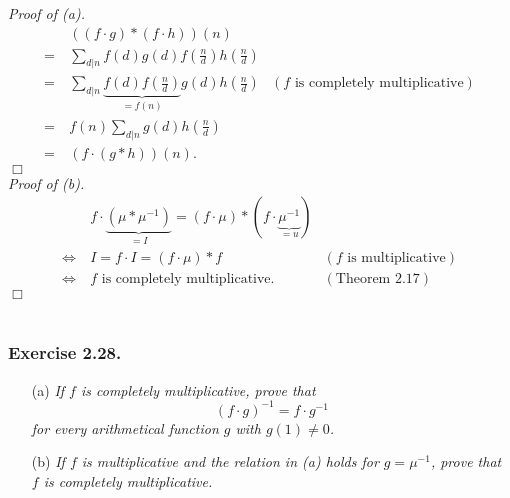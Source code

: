 \documentclass{article}
\begin{document}
\emph{Proof of (a).}
  \begin{align*}
    & \: ((f \cdot g) * (f \cdot h))(n) \\
    =& \: \sum_{d|n} f(d)g(d) f\left(\frac{n}{d}\right)h\left(\frac{n}{d}\right) \\
    =& \: \sum_{d|n} \underbrace{f(d)f\left(\frac{n}{d}\right)}_{= f(n)}
        g(d) h\left(\frac{n}{d}\right)
      & (\text{$f$ is completely multiplicative}) \\
    =& \: f(n) \sum_{d|n} g(d) h\left(\frac{n}{d}\right) \\
    =& \: (f \cdot (g * h))(n).
  \end{align*}
$\Box$ \\



\emph{Proof of (b).}
  \begin{align*}
    & \: f \cdot \underbrace{(\mu * \mu^{-1})}_{= I}
        = (f \cdot \mu) * (f \cdot \underbrace{\mu^{-1}}_{= u}) \\
    \Longleftrightarrow & \:
    I = f \cdot I = (f \cdot \mu) * f
      & (\text{$f$ is multiplicative}) \\
    \Longleftrightarrow & \:
    \text{$f$ is completely multiplicative}.
      & (\text{Theorem 2.17})
  \end{align*}
$\Box$ \\\\






\subsubsection*{Exercise 2.28.}
\begin{enumerate}
\item[(a)]
  \emph{If $f$ is completely multiplicative, prove that
  \[
    (f \cdot g)^{-1} = f \cdot g^{-1}
  \]
  for every arithmetical function $g$ with $g(1) \neq 0$.}

\item[(b)]
  \emph{If $f$ is multiplicative and the relation in (a) holds for $g = \mu^{-1}$,
  prove that $f$ is completely multiplicative.} \\
\end{enumerate}
\end{document}

